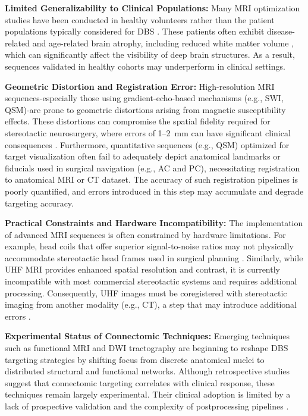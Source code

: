 \textbf{Limited Generalizability to Clinical Populations:}
Many MRI optimization studies have been conducted in healthy volunteers rather than the patient populations typically considered for DBS \cite{Boutet2021-vg}. These patients often exhibit disease-related and age-related brain atrophy, including reduced white matter volume \cite{Bonneville2005-vl,Lee2011-rf}, which can significantly affect the visibility of deep brain structures. As a result, sequences validated in healthy cohorts may underperform in clinical settings.

\textbf{Geometric Distortion and Registration Error:}
High-resolution MRI sequences-especially those using gradient-echo-based mechanisms (e.g., SWI, QSM)-are prone to geometric distortions arising from magnetic susceptibility effects. These distortions can compromise the spatial fidelity required for stereotactic neurosurgery, where errors of 1--2~mm can have significant clinical consequences \cite{Boutet2021-vg, Rasouli2018-sn, Lau2018-fp}. Furthermore, quantitative sequences (e.g., QSM) optimized for target visualization often fail to adequately depict anatomical landmarks or fiducials used in surgical navigation (e.g., AC and PC), necessitating registration to anatomical MRI or CT dataset. The accuracy of such registration pipelines is poorly quantified, and errors introduced in this step may accumulate and degrade targeting accuracy.

\textbf{Practical Constraints and Hardware Incompatibility:}
The implementation of advanced MRI sequences is often constrained by hardware limitations. For example, head coils that offer superior signal-to-noise ratios may not physically accommodate stereotactic head frames used in surgical planning \cite{Boutet2021-vg}. Similarly, while UHF MRI provides enhanced spatial resolution and contrast, it is currently incompatible with most commercial stereotactic systems and requires additional processing. Consequently, UHF images must be coregistered with stereotactic imaging from another modality (e.g., CT), a step that may introduce additional errors \cite{Lenglet2012-ii}.

\textbf{Experimental Status of Connectomic Techniques:}
Emerging techniques such as functional MRI and DWI tractography are beginning to reshape DBS targeting strategies by shifting focus from discrete anatomical nuclei to distributed structural and functional networks. Although retrospective studies suggest that connectomic targeting correlates with clinical response, these techniques remain largely experimental. Their clinical adoption is limited by a lack of prospective validation and the complexity of postprocessing pipelines \cite{Horn2017-bi}.

